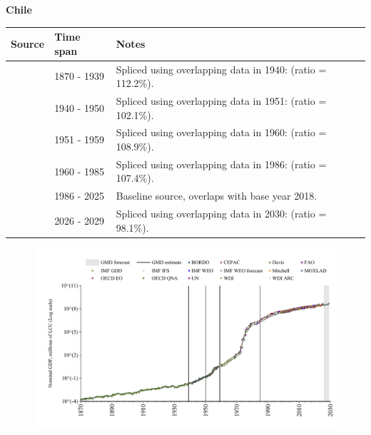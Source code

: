 \documentclass[12pt,a4paper,landscape]{article}
\begin{document}
\begin{adjustbox}{max totalsize={\paperwidth}{\paperheight},center}
\begin{minipage}[t][\textheight][t]{\textwidth}
\vspace*{0.5cm}
{}
\begin{center}
{\Large\bfseries Chile}
\end{center}
\vspace{0.5cm}
\begin{table}[H]
\centering
\small
\begin{tabular}{|l|l|l|}
\hline
\textbf{Source} & \textbf{Time span} & \textbf{Notes} \\
\hline
\rowcolor{white}\cite{Davis}& 1870 - 1939 &Spliced using overlapping data in 1940: (ratio = 112.2\%).\\
\rowcolor{lightgray}\cite{Mitchell}& 1940 - 1950 &Spliced using overlapping data in 1951: (ratio = 102.1\%).\\
\rowcolor{white}\cite{IMF_GDD}& 1951 - 1959 &Spliced using overlapping data in 1960: (ratio = 108.9\%).\\
\rowcolor{lightgray}\cite{WDI}& 1960 - 1985 &Spliced using overlapping data in 1986: (ratio = 107.4\%).\\
\rowcolor{white}\cite{OECD_EO}& 1986 - 2025 &Baseline source, overlaps with base year 2018.\\
\rowcolor{lightgray}\cite{IMF_WEO_forecast}& 2026 - 2029 &Spliced using overlapping data in 2030: (ratio = 98.1\%).\\
\hline
\end{tabular}
\end{table}
\begin{figure}[H]
\centering
\includegraphics[width=\textwidth,height=0.6\textheight,keepaspectratio]{graphs/CHL_nGDP.pdf}
\end{figure}
\end{minipage}
\end{adjustbox}
\end{document}
